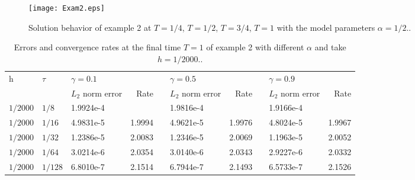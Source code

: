 \documentclass[3p,times]{elsarticle}
\begin{document}
\begin{figure}[h!b!p!]
\centering
\texttt{[image: Exam2.eps]}
\caption{Solution behavior of example 2 at $T=1/4$, $T=1/2$, $T=3/4$, $T=1$ with the model parameters $\alpha=1/2$..}\label{fig4}
\end{figure}
\begin{table}[h!b!p!]
\small
\renewcommand{\arraystretch}{1.1}
\centering
\caption{\small Errors and convergence rates at the final time $T=1$ of example 2 with different $\alpha$ and take $h=1/2000$..}\label{tab3}
\begin{tabular}{p{0cm}p{0cm}p{1.4cm}p{1cm}p{0.5cm}p{1.4cm}p{1cm}p{0.5cm}p{1.4cm}p{1cm}}
\hline
\multicolumn{1}{l}{\multirow {2}{*}{h}}& \multicolumn{1}{l}{\multirow {2}{*}{$\tau$}}& \multicolumn{2}{l}{$\gamma=0.1$}&&\multicolumn{2}{l}{$\gamma=0.5$}&&\multicolumn{2}{l}{$\gamma=0.9$}\\
\cline{3-4}\cline{6-7} \cline{9-10}
&&\multicolumn{1}{l}{$L_2$ norm error} &\multicolumn{1}{r}{Rate} && \multicolumn{1}{l}{$L_2$ norm error} &\multicolumn{1}{r}{Rate} && \multicolumn{1}{l}{$L_2$ norm error} &\multicolumn{1}{r}{Rate} \\
\hline
\multicolumn{1}{l}{$1/2000$}&\multicolumn{1}{l}{$1/8$}&1.9924e-4&&&1.9816e-4&&&1.9166e-4\\
\multicolumn{1}{l}{$1/2000$}&\multicolumn{1}{l}{$1/16$}&4.9831e-5&\multicolumn{1}{r}{1.9994}&&4.9621e-5&\multicolumn{1}{r}{1.9976}&&4.8024e-5&\multicolumn{1}{r}{1.9967}\\
\multicolumn{1}{l}{$1/2000$}&\multicolumn{1}{l}{$1/32$}&1.2386e-5&\multicolumn{1}{r}{2.0083}&&1.2346e-5&\multicolumn{1}{r}{2.0069}&&1.1963e-5&\multicolumn{1}{r}{2.0052}\\
\multicolumn{1}{l}{$1/2000$}&\multicolumn{1}{l}{$1/64$}&3.0214e-6&\multicolumn{1}{r}{2.0354}&&3.0140e-6&\multicolumn{1}{r}{2.0343}&&2.9227e-6&\multicolumn{1}{r}{2.0332}\\
\multicolumn{1}{l}{$1/2000$}&\multicolumn{1}{l}{$1/128$}&6.8010e-7&\multicolumn{1}{r}{2.1514}&&6.7944e-7&\multicolumn{1}{r}{2.1493}&&6.5733e-7&\multicolumn{1}{r}{2.1526}\\
\hline
\end{tabular}
\end{table}
\end{document}
